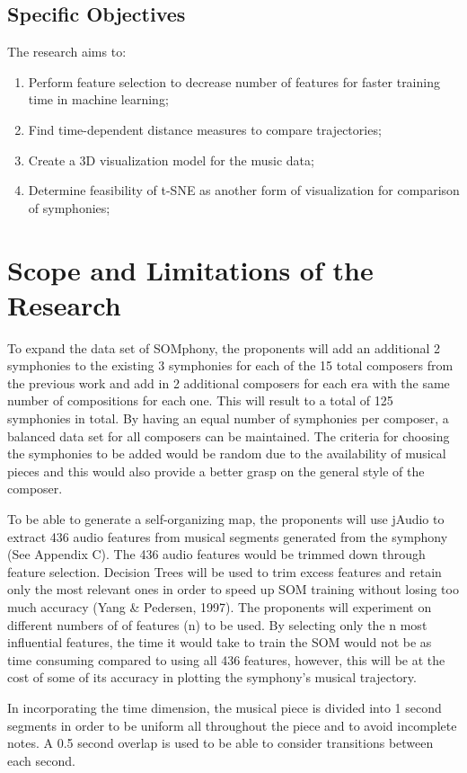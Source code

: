 \subsection{Specific Objectives}
\label{sec:specificobjectives}
The research aims to:
\begin{enumerate}
\item Perform feature selection to decrease number of features for faster training time in machine learning;
\item Find time-dependent distance measures to compare trajectories;
\item Create a 3D visualization model for the music data;
\item Determine feasibility of t-SNE as another form of visualization for comparison of symphonies;
\end{enumerate}
\section{Scope and Limitations of the Research}
\label{sec:scopelimitations}
To expand the data set of SOMphony, the proponents will add an additional 2 symphonies to the existing 3 symphonies for each of the 15 total composers from the previous work and add in 2 additional composers for each era with the same number of compositions for each one. This will result to a total of 125 symphonies in total. By having an equal number of symphonies per composer, a balanced data set for all composers can be maintained. The criteria for choosing the symphonies to be added would be random due to the availability of musical pieces and  this would also provide a better grasp on the general style of the composer.

To be able to generate a self-organizing map, the proponents will use jAudio to extract 436 audio features from musical segments generated from the symphony (See Appendix C). The 436 audio features would be trimmed down through feature selection. Decision Trees will be used to trim excess features and retain only the most relevant ones in order to speed up SOM training without losing too much accuracy (Yang \& Pedersen, 1997). The proponents will experiment on different numbers of of features (n) to be used. By selecting only the n most influential features, the time it would take to train the SOM would not be as time consuming compared to using all 436 features, however, this will be at the cost of some of its accuracy in plotting the symphony’s musical trajectory.

In incorporating the time dimension, the musical piece is divided into 1 second segments in order to be uniform all throughout the piece and to avoid incomplete notes. A 0.5 second overlap is used to be able to consider transitions between each second. 

